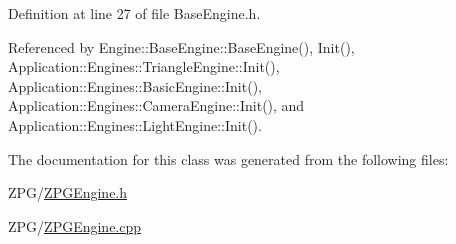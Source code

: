 Definition at line 27 of file Base\+Engine.\+h.



Referenced by Engine\+::\+Base\+Engine\+::\+Base\+Engine(), Init(), Application\+::\+Engines\+::\+Triangle\+Engine\+::\+Init(), Application\+::\+Engines\+::\+Basic\+Engine\+::\+Init(), Application\+::\+Engines\+::\+Camera\+Engine\+::\+Init(), and Application\+::\+Engines\+::\+Light\+Engine\+::\+Init().



The documentation for this class was generated from the following files\+:\begin{DoxyCompactItemize}
\item 
Z\+P\+G/\mbox{\hyperlink{ZPGEngine_8h}{Z\+P\+G\+Engine.\+h}}\item 
Z\+P\+G/\mbox{\hyperlink{ZPGEngine_8cpp}{Z\+P\+G\+Engine.\+cpp}}\end{DoxyCompactItemize}
